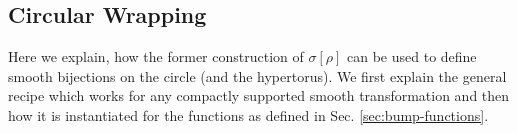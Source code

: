 \documentclass{article}
\newtheorem{lemma}{Lemma}
\begin{document}

\subsection{Circular Wrapping}
Here we explain, how the former construction of $\sigma[\rho]$ can be used to define smooth bijections on the circle (and the hypertorus). We first explain the general recipe which works for any compactly supported smooth transformation and then how it is instantiated for the functions as defined in Sec. \ref{sec:bump-functions}.
\end{document}

